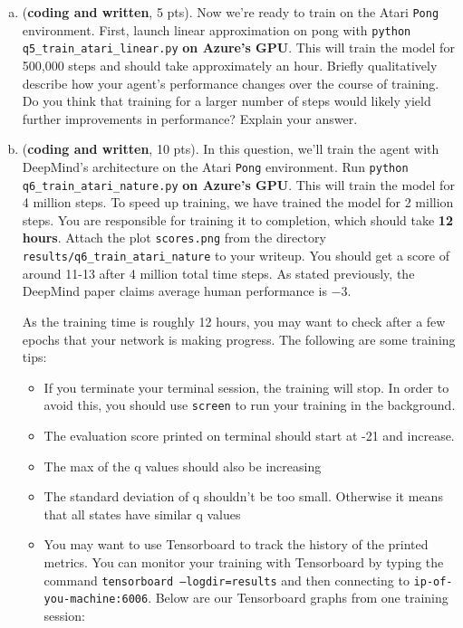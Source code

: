 \documentclass{article}
\newif\ifanswers
\newenvironment{myitemize}
{ \begin{itemize}
    \setlength{\itemsep}{0pt}
    \setlength{\parskip}{0pt}
    \setlength{\parsep}{0pt}     }
  { \end{itemize}                  }
\newcommand{\ifans}[1]{\ifanswers \color{red} \textbf{Solution: } #1 \color{black} \else {} \fi}
\begin{document}
\begin{enumerate}[(a)]
\item (\textbf{coding and written}, 5 pts). Now we're ready to train on the Atari \texttt{Pong} environment. First, launch linear approximation on pong with \texttt{python q5\_train\_atari\_linear.py} \textbf{on Azure's GPU}. This will train the model for 500,000 steps and should take approximately an hour.  Briefly qualitatively describe how your agent's performance changes over the course of training. Do you think that training for a larger number of steps would likely yield further improvements in performance? Explain your answer.

\ifans{
}

\item (\textbf{coding and written}, 10 pts). In this question, we'll train the agent with DeepMind's architecture on the Atari \texttt{Pong} environment. Run \texttt{python q6\_train\_atari\_nature.py} \textbf{on Azure's GPU}.  This will train the model for 4 million steps. To speed up training, we have trained the model for 2 million steps. You are responsible for training it to completion, which should take \textbf{12 hours}. Attach the plot \texttt{scores.png} from the directory \texttt{results/q6\_train\_atari\_nature} to your writeup.
You should get a score of around 11-13 after 4 million total time steps.  As stated previously, the DeepMind paper claims average human performance is $ -3 $.


\ifans{
}

As the training time is roughly 12 hours, you may want to check after a few epochs that your network is making progress.  The following are some training tips:

\begin{myitemize}
\item If you terminate your terminal session, the training will stop.  In order to avoid this, you should use \texttt{screen} to run your training in the background.
\item The evaluation score printed on terminal should start at -21 and increase.
\item The max of the q values should also be increasing
\item The standard deviation of q shouldn't be too small. Otherwise it means that all states have similar q values
\item You may want to use Tensorboard to track the history of the printed metrics. You can monitor your training with Tensorboard by typing the command \texttt{tensorboard --logdir=results} and then connecting to \texttt{ip-of-you-machine:6006}.  Below are our Tensorboard graphs from one training session:
\end{myitemize}


\end{enumerate}
\end{document}
